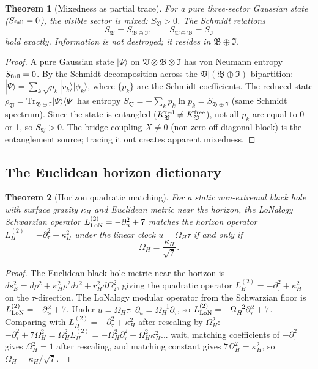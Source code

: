 \documentclass[12pt]{article}
\theoremstyle{plain}
\newtheorem{theorem}{Theorem}[section]
\theoremstyle{definition}
\numberwithin{equation}{section}
\newcommand{\fI}{\mathfrak{I}}
\newcommand{\fV}{\mathfrak{V}}
\newcommand{\fB}{\mathfrak{B}}
\newcommand{\red}{\mathrm{red}}
\begin{document}
\begin{theorem}[Mixedness as partial trace]\label{thm:BHmixed}
For a pure three-sector Gaussian state ($S_{\rm full}=0$), the visible sector is mixed: $S_\fV>0$.  The Schmidt relations
\[
S_\fV = S_{\fB\oplus\fI}, \qquad S_{\fV\oplus\fB} = S_\fI
\]
hold exactly.  Information is not destroyed; it resides in $\fB\oplus\fI$.
\end{theorem}

\begin{proof}
A pure Gaussian state $|\Psi\rangle$ on $\fV\otimes\fB\otimes\fI$ has von Neumann entropy $S_{\rm full}=0$.
By the Schmidt decomposition across the $\fV|(\fB\oplus\fI)$ bipartition:
$|\Psi\rangle=\sum_k\sqrt{p_k}|v_k\rangle|\phi_k\rangle$,
where $\{p_k\}$ are the Schmidt coefficients.
The reduced state $\rho_\fV=\mathrm{Tr}_{\fB\oplus\fI}|\Psi\rangle\langle\Psi|$ has entropy
$S_\fV=-\sum_k p_k\ln p_k=S_{\fB\oplus\fI}$ (same Schmidt spectrum).
Since the state is entangled ($K_\fV^{\red}\neq K_\fV^{\rm free}$), not all $p_k$ are equal to 0 or 1, so $S_\fV>0$.
The bridge coupling $X\neq0$ (non-zero off-diagonal block) is the entanglement source; tracing it out creates apparent mixedness.
\end{proof}

\subsection{The Euclidean horizon dictionary}

\begin{theorem}[Horizon quadratic matching]\label{thm:BHdict}
For a static non-extremal black hole with surface gravity $\kappa_H$ and Euclidean metric near the horizon,
the LoNalogy Schwarzian operator $L_{\rm LoN}^{(2)} = -\partial_u^2 + 7$ matches the horizon operator $L_H^{(2)} = -\partial_\tau^2 + \kappa_H^2$ under the linear clock $u = \Omega_H\tau$ if and only if
\[
\boxed{\Omega_H = \frac{\kappa_H}{\sqrt{7}}.}
\]
\end{theorem}

\begin{proof}
The Euclidean black hole metric near the horizon is $ds_E^2=d\rho^2+\kappa_H^2\rho^2 d\tau^2+r_H^2 d\Omega_2^2$,
giving the quadratic operator $L_H^{(2)}=-\partial_\tau^2+\kappa_H^2$ on the $\tau$-direction.
The LoNalogy modular operator from the Schwarzian floor is $L_{\rm LoN}^{(2)}=-\partial_u^2+7$.
Under $u=\Omega_H\tau$: $\partial_u=\Omega_H^{-1}\partial_\tau$, so
$L_{\rm LoN}^{(2)}=-\Omega_H^{-2}\partial_\tau^2+7$.
Comparing with $L_H^{(2)}=-\partial_\tau^2+\kappa_H^2$ after rescaling by $\Omega_H^2$:
$-\partial_\tau^2+7\Omega_H^2=\Omega_H^2 L_H^{(2)}=-\Omega_H^2\partial_\tau^2+\Omega_H^2\kappa_H^2$... wait, matching coefficients of $-\partial_\tau^2$ gives $\Omega_H^2=1$ after rescaling, and matching constant gives $7\Omega_H^2=\kappa_H^2$, so $\Omega_H=\kappa_H/\sqrt{7}$.
\end{proof}
\end{document}
